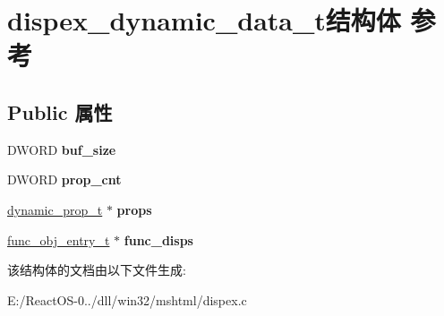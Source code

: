 \hypertarget{structdispex__dynamic__data__t}{}\section{dispex\+\_\+dynamic\+\_\+data\+\_\+t结构体 参考}
\label{structdispex__dynamic__data__t}
\subsection*{Public 属性}
\begin{DoxyCompactItemize}
\item 
\mbox{\label{structdispex__dynamic__data__t_a4a2e75a66e18568dbff9cbc331b8c5cf}} 
D\+W\+O\+RD {\bfseries buf\+\_\+size}
\item 
\mbox{\label{structdispex__dynamic__data__t_a6a413575231270feb34f6938367be2f8}} 
D\+W\+O\+RD {\bfseries prop\+\_\+cnt}
\item 
\mbox{\label{structdispex__dynamic__data__t_abb92fd28d23444bde7dedf3e8c037046}} 
\hyperlink{structdynamic__prop__t}{dynamic\+\_\+prop\+\_\+t} $\ast$ {\bfseries props}
\item 
\mbox{\label{structdispex__dynamic__data__t_aac248a519ef8c22b4a42d9a788fe8747}} 
\hyperlink{structfunc__obj__entry__t}{func\+\_\+obj\+\_\+entry\+\_\+t} $\ast$ {\bfseries func\+\_\+disps}
\end{DoxyCompactItemize}


该结构体的文档由以下文件生成\+:\begin{DoxyCompactItemize}
\item 
E\+:/\+React\+O\+S-\/0../dll/win32/mshtml/dispex.\+c\end{DoxyCompactItemize}
